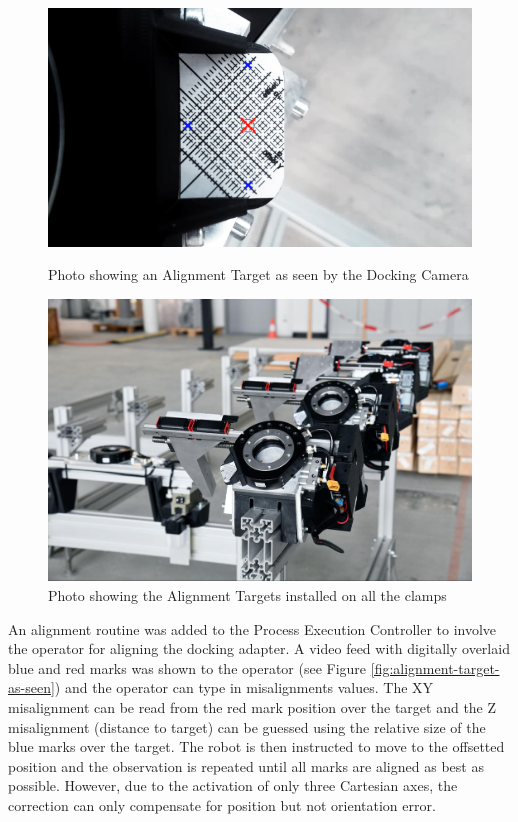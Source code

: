 \begin{figure}[!h]
    \centering
    \begin{minipage}{0.49\textwidth}
        \centering
        \includegraphics[width=\textwidth]{images/6b/img11.jpg}
        \caption{Photo showing an Alignment Target as seen by the Docking Camera}
        \label{fig:alignment-target-as-seen}
    \end{minipage}
    \hfill
    \begin{minipage}{0.49\textwidth}
        \centering
        \includegraphics[width=\textwidth]{images/6b/img10.jpg}
        \caption{Photo showing the Alignment Targets installed on all the clamps}
        \label{fig:alignment-targets-on-clamps}
    \end{minipage}
\end{figure}


An alignment routine was added to the Process Execution Controller to involve the operator for aligning the docking adapter. A video feed with digitally overlaid blue and red marks was shown to the operator (see Figure \ref{fig:alignment-target-as-seen}) and the operator can type in misalignments values. The XY misalignment can be read from the red mark position over the target and the Z misalignment (distance to target) can be guessed using the relative size of the blue marks over the target. The robot is then instructed to move to the offsetted position and the observation is repeated until all marks are aligned as best as possible. However, due to the activation of only three Cartesian axes, the correction can only compensate for position but not orientation error.


